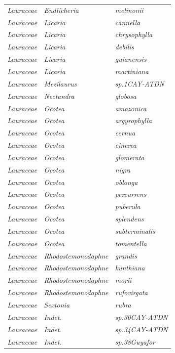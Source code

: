 \documentclass[fleqn,10pt]{ArtEcoFoG} %
\begin{document}
\begin{table}[t]
\begin{tabular}{lll}
\addlinespace
\em{Lauraceae} & \em{Endlicheria} & \em{melinonii}\\
\em{Lauraceae} & \em{Licaria} & \em{cannella}\\
\em{Lauraceae} & \em{Licaria} & \em{chrysophylla}\\
\em{Lauraceae} & \em{Licaria} & \em{debilis}\\
\em{Lauraceae} & \em{Licaria} & \em{guianensis}\\
\addlinespace
\em{Lauraceae} & \em{Licaria} & \em{martiniana}\\
\em{Lauraceae} & \em{Mezilaurus} & \em{sp.1CAY-ATDN}\\
\em{Lauraceae} & \em{Nectandra} & \em{globosa}\\
\em{Lauraceae} & \em{Ocotea} & \em{amazonica}\\
\em{Lauraceae} & \em{Ocotea} & \em{argyrophylla}\\
\addlinespace
\em{Lauraceae} & \em{Ocotea} & \em{cernua}\\
\em{Lauraceae} & \em{Ocotea} & \em{cinerea}\\
\em{Lauraceae} & \em{Ocotea} & \em{glomerata}\\
\em{Lauraceae} & \em{Ocotea} & \em{nigra}\\
\em{Lauraceae} & \em{Ocotea} & \em{oblonga}\\
\addlinespace
\em{Lauraceae} & \em{Ocotea} & \em{percurrens}\\
\em{Lauraceae} & \em{Ocotea} & \em{puberula}\\
\em{Lauraceae} & \em{Ocotea} & \em{splendens}\\
\em{Lauraceae} & \em{Ocotea} & \em{subterminalis}\\
\em{Lauraceae} & \em{Ocotea} & \em{tomentella}\\
\addlinespace
\em{Lauraceae} & \em{Rhodostemonodaphne} & \em{grandis}\\
\em{Lauraceae} & \em{Rhodostemonodaphne} & \em{kunthiana}\\
\em{Lauraceae} & \em{Rhodostemonodaphne} & \em{morii}\\
\em{Lauraceae} & \em{Rhodostemonodaphne} & \em{rufovirgata}\\
\em{Lauraceae} & \em{Sextonia} & \em{rubra}\\
\addlinespace
\em{Lauraceae} & \em{Indet.} & \em{sp.30CAY-ATDN}\\
\em{Lauraceae} & \em{Indet.} & \em{sp.34CAY-ATDN}\\
\em{Lauraceae} & \em{Indet.} & \em{sp.38Guyafor}\\

\end{tabular}
\end{table}
\end{document}
